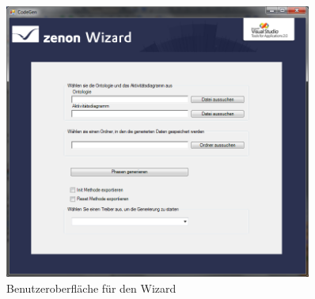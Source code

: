 \begin{figure}[hbt!]
  \centering
  \includegraphics[width=0.9\textwidth]{graphics/implementation/wizard_final}
  \caption{Benutzeroberfläche für den Wizard}
\end{figure}